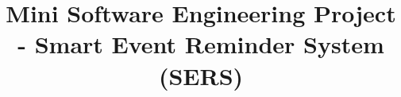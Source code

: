 \documentclass[12pt,twoside,a4paper]{hcmut_report}
\title{Mini Software Engineering Project - Smart Event Reminder System (SERS)}
\begin{document}
\coverpage





\nocite{*}
\printbibliography
\end{document}

